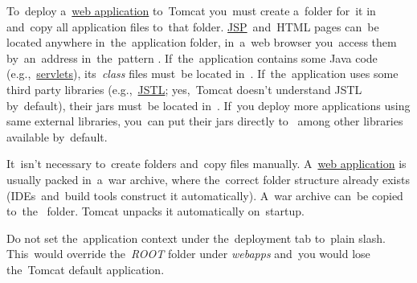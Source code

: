 \label{tomcatdeployment}
To~deploy a~\hyperref[webserviceapplication]{web application} to~Tomcat you~must create a~folder for~it in~ and~copy all application files to~that folder.
\hyperref[jsp]{JSP}~and~HTML pages can~be located anywhere in~the~application folder, in~a~web browser you~access them by~an~address in~the~pattern .
If~the~application contains some Java code (e.g.,~\hyperref[servlet]{servlets}), its~\textit{class} files must~be located in~.
If~the~application uses some third party libraries (e.g.,~\hyperref[jstl]{JSTL}; yes,~Tomcat doesn't understand JSTL by~default), their jars must~be located in~.
If~you deploy more applications using same external libraries, you~can put their jars directly to~ among other libraries available by~default.

It~isn't necessary to~create folders and~copy files manually.
A~\hyperref[webserviceapplication]{web application} is usually packed in~a~war archive, where the~correct folder structure already exists (IDEs~and~build tools construct it automatically).
A~war archive can~be copied to~the~ folder.
Tomcat unpacks it automatically on~startup.


\warning Do not set the~application context under the~deployment tab to~plain slash.
This~would override the~\textit{ROOT} folder under \textit{webapps} and~you would lose the~Tomcat default application.
